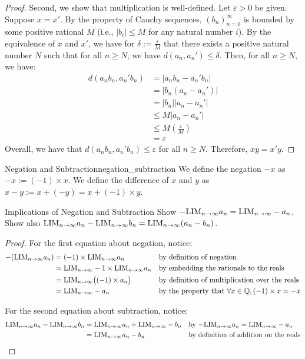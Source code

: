 \begin{proof}
    Second, we show that multiplication is well-defined. 
    Let $\varepsilon > 0$ be given.  
    Suppose $x = x'$.
    By the property of Cauchy sequences, $(b_n)_{n=0}^\infty$ is bounded by some positive rational $M$
    (i.e., $|b_i| \leq M$ for any natural number $i$).
    By the equivalence of $x$ and $x'$, we have for $\delta := \frac{\varepsilon}{M}$ that there exists a positive natural number $N$ such that for all $n \geq N$, we have $d(a_n, a _n') \leq \delta.$
    Then, for all $n \geq N$, we have:
    \begin{align*}
        d(a_n b_n, a_n' b_n) &= |a_n b_n - a_n' b_n| \\
        &= |b_n(a_n - a_n') | \\
        &= |b_n| |a_n - a_n'| \\
        &\leq M |a_n - a_n'| \\
        &\leq M (\frac{\varepsilon}{M}) \\
        &= \varepsilon
    \end{align*} 
    Overall, we have that $d(a_n b_n, a_n' b_n) \leq \varepsilon$ for all $n \geq N$. Therefore, $xy = x'y.$
\end{proof}


\begin{definition}{Negation and Subtraction}{negation_subtraction}
    We define the negation $-x$ as $-x:=(-1) \times x$.
    We define the difference of $x$ and $y$ as $x - y := x + (-y) = x + (-1) \times y$.
\end{definition}

\begin{problem}{Implications of Negation and Subtraction}
    Show $-\text{LIM}_{n \to \infty} a_n = \text{LIM}_{n \to \infty} -a_n$.
    Show also $\text{LIM}_{n \to \infty} a_n - \text{LIM}_{n \to \infty} b_n = \text{LIM}_{n \to \infty} (a_n - b_n)$.
\end{problem}
\begin{proof}
    For the first equation about negation, notice:
    \begin{align*}
        -(\text{LIM}_{n \to \infty} a_n) &= (-1) \times \text{LIM}_{n \to \infty} a_n && \text{by definition of negation}\\
        &= \text{LIM}_{n \to \infty} -1 \times \text{LIM}_{n \to \infty} a_n &&\text{by embedding the rationals to the reals}\\
        &= \text{LIM}_{n \to \infty} \big((-1) \times a_n \big) &&\text{by definition of multiplication over the reals} \\
        &= \text{LIM}_{n \to \infty} -a_n &&\text{by the property that $\forall x \in \mathbb{Q}, (-1)\times x = -x$}
    \end{align*}

    For the second equation about subtraction, notice:
    \begin{align*}
        \text{LIM}_{n \to \infty} a_n - \text{LIM}_{n \to \infty} b_n &= \text{LIM}_{n \to \infty} a_n + \text{LIM}_{n \to \infty} -b_n &&\text{by $-\text{LIM}_{n \to \infty} a_n = \text{LIM}_{n \to \infty} -a_n$}\\
        &= \text{LIM}_{n \to \infty} a_n - b_n && \text{by definition of addition on the reals}
    \end{align*}
\end{proof}

